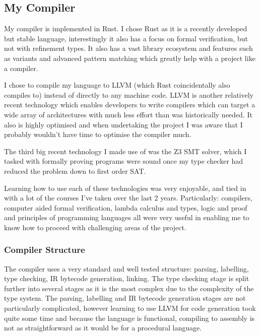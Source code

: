 \subsection{My Compiler}

My compiler is implemented in Rust.
I chose Rust as it is a recently developed but stable language, interestingly it also has a focus
on formal verification, but not with refinement types.
It also has a vast library ecosystem and features such as variants and advanced pattern matching
which greatly help with a project like a compiler.

I chose to compile my language to LLVM (which Rust coincidentally also compiles to) instead of
directly to any machine code.
LLVM is another relatively recent technology which enables developers to write compilers which can
target a wide array of architectures with much less effort than was historically needed.
It also is highly optimised and when undertaking the project I was aware that I probably wouldn't
have time to optimise the compiler much.

The third big recent technology I made use of was the Z3 SMT solver, which I tasked with formally
proving programs were sound once my type checker had reduced the problem down to first order SAT.

Learning how to use each of these technologies was very enjoyable, and tied in with a lot of the
courses I've taken over the last 2 years.
Particularly: compilers, computer aided formal verification, lambda calculus and types, logic and proof
and principles of programming languages all were very useful in enabling me to know how to proceed
with challenging areas of the project.

\subsubsection{Compiler Structure}

The compiler uses a very standard and well tested structure: parsing, labelling, type checking,
IR bytecode generation, linking.
The type checking stage is split further into several stages as it is the most complex due to the
complexity of the type system.
The parsing, labelling and IR bytecode generation stages are not particularly complicated, however
learning to use LLVM for code generation took quite some time and because the language is functional,
compiling to assembly is not as straightforward as it would be for a procedural language.
